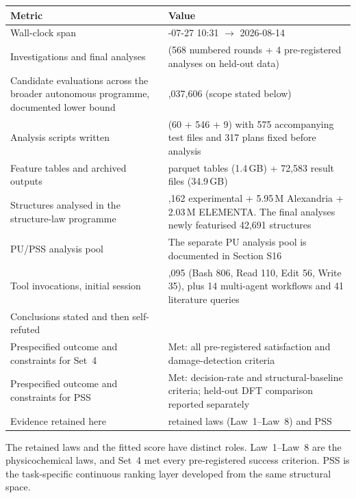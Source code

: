 {\def\LTcaptype{none} %
\begin{longtable}[]{@{}
  >{\raggedright\arraybackslash}p{}
  >{\raggedright\arraybackslash}p{}@{}}
\toprule\noalign{}
\begin{minipage}[b]{\linewidth}\raggedright
Metric
\end{minipage} & \begin{minipage}[b]{\linewidth}\raggedright
Value
\end{minipage} \\
\midrule\noalign{}
\endhead
\bottomrule\noalign{}
\endlastfoot
Wall-clock span & 2026-07-27 10:31 $\rightarrow$ 2026-08-14 \\
Investigations and final analyses & 572 (568 numbered rounds + 4 pre-registered analyses on held-out data) \\
Candidate evaluations across the broader autonomous programme, documented lower bound & 2,037,606 (scope stated below) \\
Analysis scripts written & 615 (60 + 546 + 9) with 575 accompanying test files and 317 plans fixed before analysis \\
Feature tables and archived outputs & 84 parquet tables (1.4\,GB) + 72,583 result files (34.9\,GB) \\
Structures analysed in the structure-law programme & 99,162 experimental + 5.95\,M Alexandria + 2.03\,M ELEMENTA. The final analyses newly featurised 42,691 structures \\
PU/PSS analysis pool & The separate PU analysis pool is documented in Section S16 \\
Tool invocations, initial session & 1,095 (Bash 806, Read 110, Edit 56, Write 35), plus 14 multi-agent workflows and 41 literature queries \\
Conclusions stated and then self-refuted & 11 \\
Prespecified outcome and constraints for Set~4 & Met: all pre-registered satisfaction and damage-detection criteria \\
Prespecified outcome and constraints for PSS & Met: decision-rate and structural-baseline criteria; held-out DFT comparison reported separately \\
Evidence retained here & 8 retained laws (Law~1--Law~8) and PSS \\
\end{longtable}
}

The retained laws and the fitted score have distinct roles. Law~1--Law~8 are the
physicochemical laws, and Set~4 met every pre-registered success criterion. PSS is the
task-specific continuous ranking layer developed from the same structural space.

